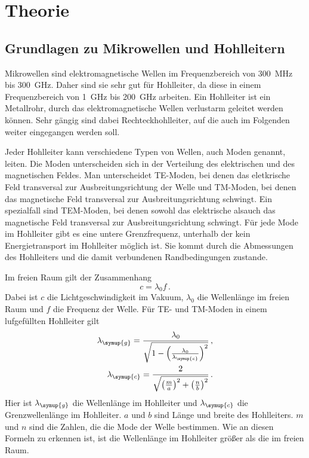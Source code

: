 \section{Theorie}
\label{sec:Theorie}

\subsection{Grundlagen zu Mikrowellen und Hohlleitern}
\label{subsec:grundlagen}
Mikrowellen sind elektromagnetische Wellen im Frequenzbereich von \SI{300}{\mega\Hz}
bis \SI{300}{\giga\Hz}. Daher sind sie sehr gut für Hohlleiter, da diese in einem
Frequenzbereich von \SI{1}{\giga\Hz} bis \SI{200}{\giga\Hz} arbeiten. Ein Hohlleiter ist
ein Metallrohr, durch das elektromagnetische Wellen verlustarm geleitet werden können.
Sehr gängig sind dabei Rechteckhohlleiter, auf die auch im Folgenden weiter eingegangen
werden soll.

Jeder Hohlleiter kann verschiedene Typen von Wellen, auch Moden genannt, leiten.
Die Moden unterscheiden sich in der Verteilung des elektrischen und des magnetischen
Feldes. Man unterscheidet TE-Moden, bei denen das eletkrische Feld transversal zur
Ausbreitungsrichtung der Welle und TM-Moden, bei denen das magnetische Feld transversal
zur Ausbreitungsrichtung schwingt. Ein spezialfall sind TEM-Moden, bei denen sowohl
das elektrische alsauch das magnetische Feld transversal zur Ausbreitungsrichtung
schwingt. Für jede Mode im Hohlleiter gibt es eine untere Grenzfrequenz, unterhalb
der kein Energietransport im Hohlleiter möglich ist. Sie kommt durch die Abmessungen
des Hohlleiters und die damit verbundenen Randbedingungen zustande.

Im freien Raum gilt der Zusammenhang
\begin{equation}
  c= \lambda_0 f\,.
  \label{eqn:frequenz}
\end{equation}
Dabei ist $c$ die Lichtgeschwindigkeit im Vakuum, $\lambda_0$ die Wellenlänge im
freien Raum und $f$ die Frequenz der Welle.
Für TE- und TM-Moden in einem lufgefüllten Hohlleiter gilt
\begin{align}
  \lambda_{\symup{g}}=\frac{\lambda_0}{\sqrt{1-\left(\frac{\lambda_0}
  {\lambda_{\symup{c}}}\right)^2}} \,, \\
  \lambda_{\symup{c}}=\frac{2}{\sqrt{\left(\frac{m}{a}\right)^2+
  \left(\frac{n}{b}\right)^2}} \,.
  \label{eqn:hohlleiter}
\end{align}
Hier ist $\lambda_{\symup{g}}$ die Wellenlänge im Hohlleiter und $\lambda_{\symup{c}}$
die Grenzwellenlänge im Hohlleiter. $a$ und $b$ sind Länge und breite des Hohlleiters.
$m$ und $n$ sind die Zahlen, die die Mode der Welle bestimmen.
Wie an diesen Formeln zu erkennen ist, ist die Wellenlänge im Hohlleiter
größer als die im freien Raum.

